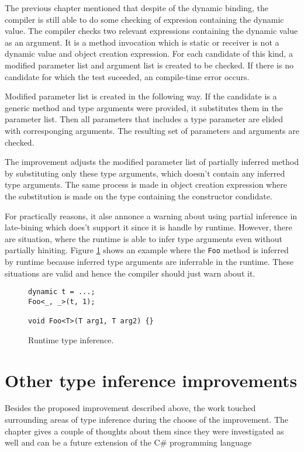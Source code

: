 The previous chapter mentioned that despite of the dynamic binding, the compiler is still able to do some checking of expresion containing the dynamic value.
The compiler checks two relevant expressions containing the dynamic value as an argument.
It is a method invocation which is static or receiver is not a dynamic value and object creation expression.
For each candidate of this kind, a modified parameter list and argument list is created to be checked.
If there is no candidate for which the test suceeded, an compile-time error occurs.
\par
Modified parameter list is created in the following way.
If the candidate is a generic method and type arguments were provided, it substitutes them in the parameter list.
Then all parameters that includes a type parameter are elided with corresponging arguments.
The resulting set of parameters and arguments are checked.
\par
The improvement adjusts the modified parameter list of partially inferred method by substituting only these type arguments, which doesn't contain any inferred type arguments.
The same process is made in object creation expression where the substitution is made on the type containing the constructor condidate.
\par
For practically reasons, it alse annonce a warning about using partial inference in late-bining which does't support it since it is handle by runtime.
However, there are situation, where the runtime is able to infer type arguments even without partially hiniting.
Figure \ref{img63:dinamic} shows an example where the \texttt{Foo} method is inferred by runtime because inferred type arguments are inferrable in the runtime.
These situations are valid and hence the compiler should just warn about it.
\begin{figure}[h!]
\begin{lstlisting}[style=csharp, mathescape=true]
dynamic t = ...;
Foo<_, _>(t, 1);

void Foo<T>(T arg1, T arg2) {}
\end{lstlisting}
\caption{Runtime type inference.}
\label{img63:dinamic}
\end{figure}

\section{Other type inference improvements}

Besides the proposed improvement described above, the work touched surrounding areas of type inference during the choose of the improvement.
The chapter gives a couple of thoughts about them since they were investigated as well and can be a future extension of the C\# programming language

